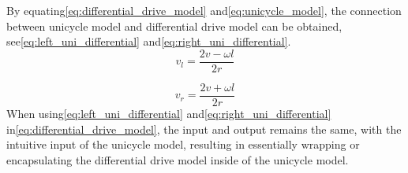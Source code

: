 By equating\:\eqref{eq:differential_drive_model} and\:\eqref{eq:unicycle_model}, the connection between unicycle model and differential drive model can be obtained, see\:\eqref{eq:left_uni_differential} and\:\eqref{eq:right_uni_differential}\:\cite{carlenerikssonLectureKinematicsBehavioral2024}.
\begin{dmath}
    \label{eq:left_uni_differential}
    v_l = \frac{2 v - \omega l}{2 r}
\end{dmath}

\begin{dmath}
    \label{eq:right_uni_differential}
    v_r = \frac{2 v + \omega l}{2 r}
\end{dmath}
When using\:\eqref{eq:left_uni_differential} and\:\eqref{eq:right_uni_differential} in\:\eqref{eq:differential_drive_model}, the input and output remains the same, with the intuitive input of the unicycle model, resulting in essentially wrapping or encapsulating the differential drive model inside of the unicycle model.



\begin{comment}
\end{comment}
